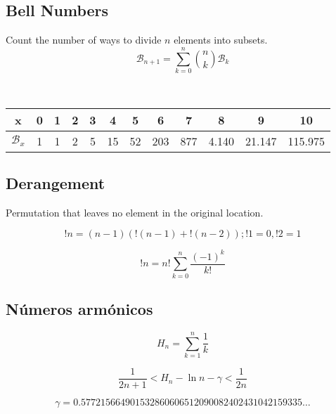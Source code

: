 \documentclass[a4paper]{amsart}
\begin{document}
      \subsection{Bell Numbers} Count the number of ways to divide $n$ elements into subsets.
      \begin{equation*}
        \mathcal{B}_{n+1} = \sum_{k=0}^n \binom{n}{k} \mathcal{B}_k
      \end{equation*}

      \

      \begin{tabular}{|c|c|c|c|c|c|c|c|c|c|c|c|}
        \hline
        x&0&1&2&3&4&5&6&7&8&9&10 \\ \hline %
        $\mathcal{B}_x$&1&1&2&5&15&52&203&877&4.140&21.147&115.975 \\ \hline %
      \end{tabular}

      \subsection{Derangement} Permutation that leaves no element in the original location.

      \begin{equation*}
        !n = (n - 1)( !(n - 1) + !(n - 2) ); !1 = 0, !2 = 1
      \end{equation*}

      \begin{equation*}
        !n = n! \sum_{k = 0}^n \frac{(-1)^k}{k!}
      \end{equation*}

    \subsection{Números armónicos}

    \begin{equation*}
     H_n = \sum_{k = 1}^n \frac{1}{k}
    \end{equation*}

    \begin{equation*}
     \frac{1}{2n+1} < H_n - \ln n - \gamma < \frac{1}{2n}
    \end{equation*}

    \begin{equation*}
     \gamma = 0.57721 56649 01532 86060 65120 90082 40243 10421 59335 \ldots
    \end{equation*}
\end{document}
